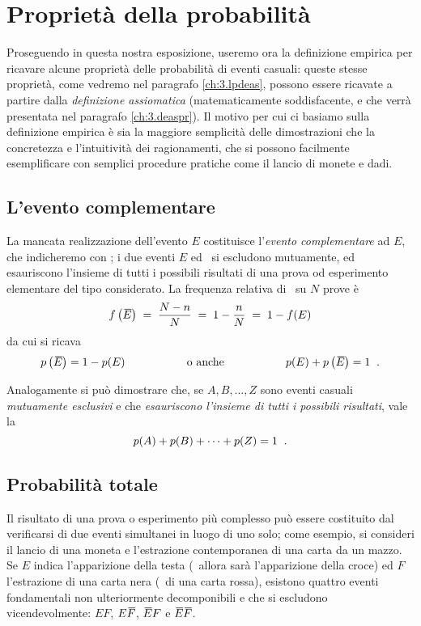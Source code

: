 \section{Propriet\`a della probabilit\`a}
Proseguendo in questa nostra esposizione, useremo ora la
definizione empirica per ricavare alcune propriet\`a delle
probabilit\`a di eventi casuali: queste stesse propriet\`a,
come vedremo nel paragrafo \ref{ch:3.lpdeas}, possono essere
ricavate a partire dalla \emph{definizione assiomatica}
(matematicamente soddisfacente, e che verr\`a presentata nel
paragrafo \ref{ch:3.deaspr}).  Il motivo per cui ci basiamo
sulla definizione empirica \`e sia la maggiore semplicit\`a
delle dimostrazioni che la concretezza e l'intuitivit\`a dei
ragionamenti, che si possono facilmente esemplificare con
semplici procedure pratiche come il lancio di monete e dadi.

\subsection{L'evento complementare}
La mancata realizzazione dell'evento $E$ costituisce
l'\emph{evento complementare}%
ad $E$, che indicheremo con ; i due eventi $E$ ed
\ si escludono mutuamente, ed esauriscono l'insieme di
tutti i possibili risultati di una prova od esperimento
elementare del tipo considerato.  La frequenza relativa di
\ su $N$ prove \`e
\begin{equation*}
  f \left( \ob{E} \right)
  \; = \; \frac{N-n}{N}
  \; = \; 1-\frac{n}{N} \; = \; 1-f(E)
\end{equation*}
da cui si ricava
\begin{equation*}
  p \left( \ob{E} \right) = 1-p(E)
  \makebox[50mm]{o anche}
  p ( E ) + p \left( \ob{E} \right) = 1 \peq .
\end{equation*}

Analogamente si pu\`o dimostrare che, se $A,B,\ldots,Z$ sono
eventi casuali \emph{mutuamente esclusivi} e che
\emph{esauriscono l'insieme di tutti i possibili risultati},
vale la
\begin{equation} \label{eq:3.norpro}
  p(A) + p(B) +\cdots+ p(Z) = 1 \;\; .
\end{equation}

\subsection{Probabilit\`a totale}
Il risultato di una prova o esperimento pi\`u complesso
pu\`o essere costituito dal verificarsi di due eventi
simultanei in luogo di uno solo; come esempio, si consideri
il lancio di una moneta e l'estrazione contemporanea di una
carta da un mazzo.  Se $E$ indica l'apparizione della testa
(\ allora sar\`a l'apparizione della croce) ed $F$
l'estrazione di una carta nera (\ di una carta rossa),
esistono quattro eventi fondamentali non ulteriormente
decomponibili e che si escludono vicendevolmente: $E F$, $E
\ob{F}$, $\ob{E} F$ e $\ob{E} \ob{F}$.

